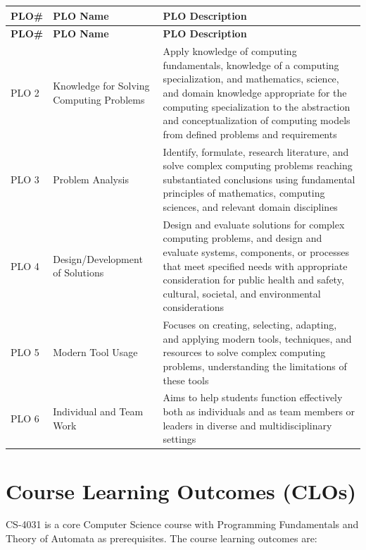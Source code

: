 \documentclass{article}
\begin{document}
\renewcommand{\arraystretch}{1.4}
\begin{longtable}{|l|p{3.3cm}|p{10.3cm}|}
\hline
\textbf{PLO\#}  & \textbf{PLO Name} & \textbf{PLO Description} \\ \hline
\endfirsthead
\hline
\textbf{PLO\#}  & \textbf{PLO Name} & \textbf{PLO Description} \\ \hline
\endhead
PLO 2 & Knowledge for Solving Computing Problems &
Apply knowledge of computing fundamentals, knowledge of a computing specialization, and mathematics, science, and domain knowledge appropriate for the computing specialization to the abstraction and conceptualization of computing models from defined problems and requirements \\ \hline
PLO 3 & Problem Analysis & Identify, formulate, research literature, and solve complex computing problems reaching substantiated conclusions using fundamental principles of mathematics, computing sciences, and relevant domain disciplines \\ \hline
PLO 4 & Design/Development of Solutions & Design and evaluate solutions for complex computing problems, and design and evaluate systems, components, or processes that meet specified needs with appropriate consideration for public health and safety, cultural, societal, and environmental considerations \\ \hline
PLO 5&  Modern Tool Usage & Focuses on creating, selecting, adapting, and applying modern tools, techniques, and resources to solve complex computing problems, understanding the limitations of these tools \\ \hline
PLO 6 & Individual and Team Work & Aims to help students function effectively both as individuals and as team members or leaders in diverse and multidisciplinary settings \\ \hline
\end{longtable}

\section*{Course Learning Outcomes (CLOs)}
CS-4031 is a core Computer Science course with Programming Fundamentals and Theory of Automata as prerequisites. The course learning outcomes are:
\end{document}
